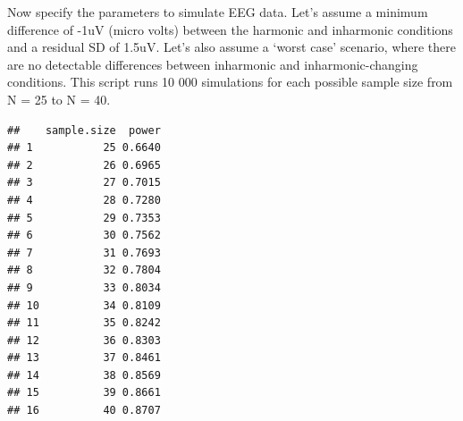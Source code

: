 \documentclass[
]{article}
\newenvironment{Shaded}{\begin{snugshade}}{\end{snugshade}}
\newcommand{\AttributeTok}[1]{\textcolor[rgb]{0.77,0.63,0.00}{#1}}
\newcommand{\CommentTok}[1]{\textcolor[rgb]{0.56,0.35,0.01}{\textit{#1}}}
\newcommand{\ControlFlowTok}[1]{\textcolor[rgb]{0.13,0.29,0.53}{\textbf{#1}}}
\newcommand{\DecValTok}[1]{\textcolor[rgb]{0.00,0.00,0.81}{#1}}
\newcommand{\FloatTok}[1]{\textcolor[rgb]{0.00,0.00,0.81}{#1}}
\newcommand{\FunctionTok}[1]{\textcolor[rgb]{0.00,0.00,0.00}{#1}}
\newcommand{\NormalTok}[1]{#1}
\newcommand{\OtherTok}[1]{\textcolor[rgb]{0.56,0.35,0.01}{#1}}
\newcommand{\SpecialCharTok}[1]{\textcolor[rgb]{0.00,0.00,0.00}{#1}}
\newcommand{\StringTok}[1]{\textcolor[rgb]{0.31,0.60,0.02}{#1}}
\begin{document}
Now specify the parameters to simulate EEG data. Let's assume a minimum
difference of -1uV (micro volts) between the harmonic and inharmonic
conditions and a residual SD of 1.5uV. Let's also assume a `worst case'
scenario, where there are no detectable differences between inharmonic
and inharmonic-changing conditions. This script runs 10 000 simulations
for each possible sample size from N = 25 to N = 40.

\begin{Shaded}
\end{Shaded}

\begin{verbatim}
##    sample.size  power
## 1           25 0.6640
## 2           26 0.6965
## 3           27 0.7015
## 4           28 0.7280
## 5           29 0.7353
## 6           30 0.7562
## 7           31 0.7693
## 8           32 0.7804
## 9           33 0.8034
## 10          34 0.8109
## 11          35 0.8242
## 12          36 0.8303
## 13          37 0.8461
## 14          38 0.8569
## 15          39 0.8661
## 16          40 0.8707
\end{verbatim}
\end{document}

